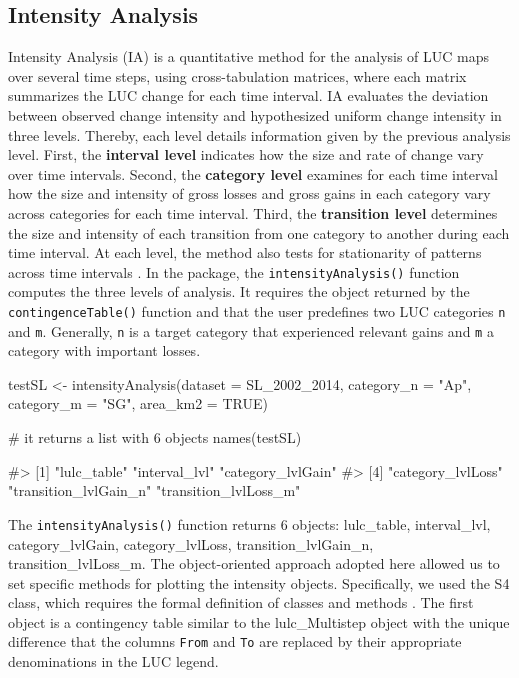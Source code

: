 \hypertarget{intensity-analysis}{%
\subsection{Intensity Analysis}\label{intensity-analysis}}

Intensity Analysis (IA) is a quantitative method for the analysis of LUC
maps over several time steps, using cross-tabulation matrices, where
each matrix summarizes the LUC change for each time interval. IA
evaluates the deviation between observed change intensity and
hypothesized uniform change intensity in three levels. Thereby, each
level details information given by the previous analysis level. First,
the \textbf{interval level} indicates how the size and rate of change
vary over time intervals. Second, the \textbf{category level} examines
for each time interval how the size and intensity of gross losses and
gross gains in each category vary across categories for each time
interval. Third, the \textbf{transition level} determines the size and
intensity of each transition from one category to another during each
time interval. At each level, the method also tests for stationarity of
patterns across time intervals \citep{Aldwaik2012}. In the 
package, the \texttt{intensityAnalysis()} function computes the three
levels of analysis. It requires the object returned by the
\texttt{contingenceTable()} function and that the user predefines two
LUC categories \texttt{n} and \texttt{m}. Generally, \texttt{n} is a
target category that experienced relevant gains and \texttt{m} a
category with important losses.

\begin{Schunk}
\begin{Sinput}
testSL <- intensityAnalysis(dataset = SL_2002_2014, category_n = "Ap",
                            category_m = "SG", area_km2 = TRUE)

# it returns a list with 6 objects
names(testSL)
\end{Sinput}
\begin{Soutput}
#> [1] "lulc_table"           "interval_lvl"         "category_lvlGain"    
#> [4] "category_lvlLoss"     "transition_lvlGain_n" "transition_lvlLoss_m"
\end{Soutput}
\end{Schunk}

The \texttt{intensityAnalysis()} function returns 6 objects:
lulc\_table, interval\_lvl, category\_lvlGain, category\_lvlLoss,
transition\_lvlGain\_n, transition\_lvlLoss\_m. The object-oriented
approach adopted here allowed us to set specific methods for plotting
the intensity objects. Specifically, we used the S4 class, which
requires the formal definition of classes and methods
\citep{Chambers2008}. The first object is a contingency table similar to
the lulc\_Multistep object with the unique difference that the columns
\texttt{From} and \texttt{To} are replaced by their appropriate
denominations in the LUC legend.

